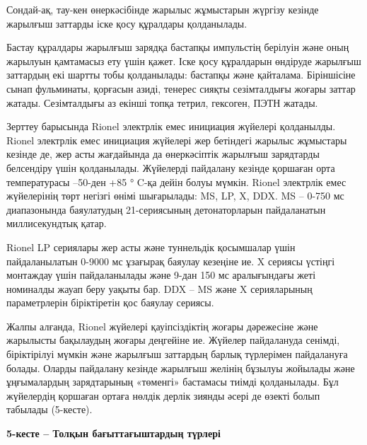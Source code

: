 Сондай-ақ, тау-кен өнеркәсібінде жарылыс жұмыстарын жүргізу кезінде
жарылғыш заттарды іске қосу құралдары қолданылады.

Бастау құралдары жарылғыш зарядқа бастапқы импульстің берілуін және оның
жарылуын қамтамасыз ету үшін қажет. Іске қосу құралдарын өндіруде
жарылғыш заттардың екі шартты тобы қолданылады: бастапқы және қайталама.
Біріншісіне сынап фульминаты, қорғасын азиді, тенерес сияқты
сезімталдығы жоғары заттар жатады. Сезімталдығы аз екінші топқа тетрил,
гексоген, ПЭТН жатады.

Зерттеу барысында Rionel электрлік емес инициация жүйелері қолданылды.
Rionel электрлік емес инициация жүйелері жер бетіндегі жарылыс жұмыстары
кезінде де, жер асты жағдайында да өнеркәсіптік жарылғыш зарядтарды
белсендіру үшін қолданылады. Жүйелерді пайдалану кезінде қоршаған орта
температурасы --50-ден +85 ° C-қа дейін болуы мүмкін. Rionel электрлік
емес жүйелерінің төрт негізгі өнімі шығарылады: MS, LP, X, DDX. MS --
0-750 мс диапазонында баяулатудың 21-сериясының детонаторларын
пайдаланатын миллисекундтық қатар.

Rionel LP сериялары жер асты және туннельдік қосымшалар үшін
пайдаланылатын 0-9000 мс ұзағырақ баяулау кезеңіне ие. X сериясы үстіңгі
монтаждау үшін пайдаланылады және 9-дан 150 мс аралығындағы жеті
номиналды жауап беру уақыты бар. DDX -- MS және X серияларының
параметрлерін біріктіретін қос баяулау сериясы.

Жалпы алғанда, Rionel жүйелері қауіпсіздіктің жоғары дәрежесіне және
жарылысты бақылаудың жоғары деңгейіне ие. Жүйелер пайдалануда сенімді,
біріктірілуі мүмкін және жарылғыш заттардың барлық түрлерімен
пайдалануға болады. Оларды пайдалану кезінде жарылғыш желінің бұзылуы
жойылады және ұңғымалардың зарядтарының «төменгі» бастамасы тиімді
қолданылады. Бұл жүйелердің қоршаған ортаға нөлдік дерлік зиянды әсері
де өзекті болып табылады (5-кесте).

{\bfseries 5-кесте -- Толқын бағыттағыштардың түрлері}


